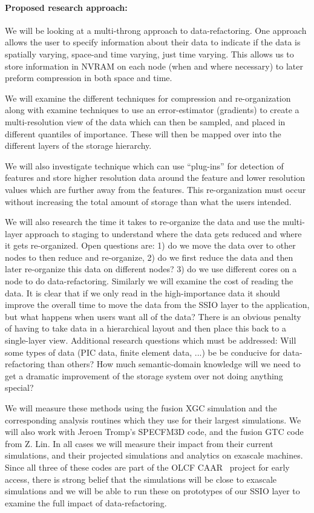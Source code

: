 \paragraph{Proposed research approach:} We will be looking at a multi-throng
approach to data-refactoring. One approach allows the user to specify
information about their data to indicate if the data is spatially varying,
space-and time varying, just time varying. This allows us to store information
in NVRAM on each node (when and where necessary) to later preform compression
in both space and time. 

We will examine the different techniques for
compression and re-organization along with examine techniques to use an
error-estimator (gradients) to create a multi-resolution view of the data which
can then be sampled, and placed in different quantiles of importance. These
will then be mapped over into the different layers of the storage hierarchy.

We will also investigate technique which can use ``plug-ins'' for detection of
features and store higher resolution data around the feature and lower
resolution values which are further away from the features. This
re-organization must occur without increasing the total amount of storage than
what the users intended. 

We will also research the time it takes to
re-organize the data and use the multi-layer approach to staging to understand
where the data gets reduced and where it gets re-organized. Open questions are:
1) do we move the data over to other nodes to then reduce and re-organize, 2)
do we first reduce the data and then later re-organize this data on different
nodes?  3) do we use different cores on a node to do data-refactoring.
Similarly we will examine the cost of reading the data. It is clear that if we
only read in the high-importance data it should improve the overall time to
move the data from the SSIO layer to the application, but what happens when
users want all of the data? There is an obvious penalty of having to take data
in a hierarchical layout and then place this back to a single-layer view.
Additional research questions which must be addressed: Will some types of data
(PIC data, finite element data, ...) be be conducive  for data-refactoring than
others? How much semantic-domain knowledge will we need to get a dramatic
improvement of the storage system over not doing anything special? 

We will measure these methods using the fusion XGC simulation and the
corresponding analysis routines which they use for their largest simulations.
We will also work with Jeroen Tromp's SPECFM3D code, and the fusion GTC code
from Z. Lin. In all cases we will measure their impact from their current
simulations, and their projected simulations and analytics on exascale
machines. Since all three of these codes are part of the OLCF CAAR~\cite{CAAR}
project for early access, there is strong belief that the simulations will be
close to exascale simulations and we will be able to run these on prototypes of
our SSIO layer to examine the full impact of data-refactoring.

